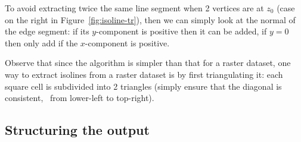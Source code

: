 To avoid extracting twice the same line segment when 2 vertices are at $z_0$ (case on the right in Figure~\ref{fig:isoline-tr}), then we can simply look at the normal of the edge segment: if its $y$-component is positive then it can be added, if $y=0$ then only add if the $x$-component is positive.

Observe that since the algorithm is simpler than that for a raster dataset, one way to extract isolines from a raster dataset is by first triangulating it: each square cell is subdivided into 2 triangles (simply ensure that the diagonal is consistent, \eg\ from lower-left to top-right).








\subsection{Structuring the output}%
\label{sec:structuring}

